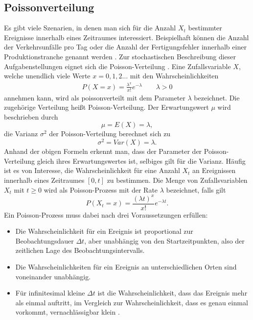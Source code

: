 \subsection{Poissonverteilung}
\label{sec.Poissonverteilung}
Es gibt viele Szenarien, in denen man sich für die Anzahl $X_t$ bestimmter Ereignisse innerhalb eines Zeitraumes interessiert. Beispielhaft können die Anzahl der Verkehrsunfälle pro Tag oder die Anzahl der Fertigungsfehler innerhalb einer Produktionstranche genannt werden \cite{Teschl.2014}. Zur stochastischen Beschreibung dieser Aufgabenstellungen eignet sich die Poisson-Verteilung \cite{Teschl.2014}.
Eine Zufallsvariable $X$, welche unendlich viele Werte $x=0,1,2\dots$ mit den Wahrscheinlichkeiten
\begin{align}
	P(X=x) = \frac{\lambda^{x}}{x!} e^{-\lambda}\qquad  \lambda >0
	\label{eq:Poisson Verteilung}
\end{align}
annehmen kann, wird als poissonverteilt mit dem Parameter $\lambda$ bezeichnet. Die zugehörige Verteilung heißt Poisson-Verteilung. Der Erwartungswert $\mu$ wird beschrieben durch 
\begin{equation}\label{eq:Poisson_EW}
	\mu = E(X) = \lambda ,
\end{equation}
die Varianz $\sigma ^2$ der Poisson-Verteilung berechnet sich zu
\begin{equation}\label{eq:Poisson_Var}
	\sigma^2 = Var(X) = \lambda .
\end{equation}
Anhand der obigen Formeln erkennt man, dass der Parameter der Poisson-Verteilung gleich ihres Erwartungswertes ist, selbiges gilt für die Varianz.
Häufig ist es von Interesse, die Wahrscheinlichkeit für eine Anzahl $X_t$ an Ereignissen innerhalb eines Zeitraumes $[0, t]$ zu bestimmen.
Die Menge von Zufallsvariablen $X_t$ mit $ t\geq 0$ wird als Poisson-Prozess mit der Rate $\lambda$ bezeichnet, falls gilt
\begin{equation}
	P(X_t=x) = \frac{(\lambda t)^x}{x!} e^{-\lambda t} .
	\label{eq:Poisson-Prozess}
\end{equation}
Ein Poisson-Prozess muss dabei nach \cite{Teschl.2014} drei Voraussetzungen erfüllen:
\begin{itemize}
	\item Die Wahrscheinlichkeit für ein Ereignis ist proportional zur Beobachtungsdauer $\Delta t$, aber unabhängig von den Startzeitpunkten, also der zeitlichen Lage des Beobachtungsintervalls.
	\item Die Wahrscheinlichkeiten für ein Ereignis an unterschiedlichen Orten sind voneinander unabhängig.
	\item Für infinitesimal kleine $\Delta t$ ist die Wahrscheinlichkeit, dass das Ereignis mehr als einmal auftritt, im Vergleich zur Wahrscheinlichkeit, dass es genau einmal vorkommt, vernachlässigbar klein \cite{Teschl.2014}.
\end{itemize}

